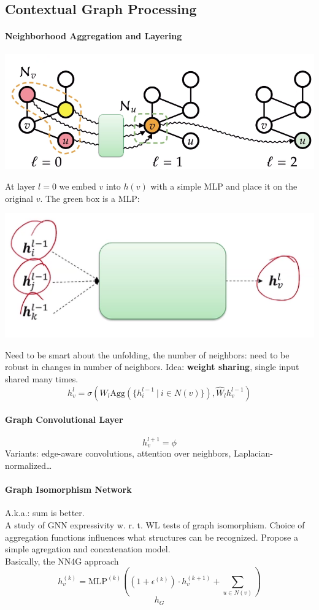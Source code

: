 \documentclass[10pt]{report}
\begin{document}
\subsection{Contextual Graph Processing}
\paragraph{Neighborhood Aggregation and Layering}
\begin{center}
	\includegraphics[scale=0.5]{198.png}
\end{center}
At layer $l=0$ we embed $v$ into $h(v)$ with a simple MLP and place it on the original $v$.
The green box is a MLP:
\begin{center}
	\includegraphics[scale=0.5]{199.png}
\end{center}
Need to be smart about the unfolding, the number of neighbors: need to be robust in changes in number of neighbors. Idea: \textbf{weight sharing}, single input shared many times. %
$$h_v^l = \sigma(W_l\text{Agg}(\{h_i^{l-1}\:|\:i\in N(v)\}), \hat{W}_l h_v^{l-1})$$
\paragraph{Graph Convolutional Layer} %
$$h_v^{l+1} = \phi $$
Variants: edge-aware convolutions, attention over neighbors, Laplacian-normalized\ldots
\paragraph{Graph Isomorphism Network} A.k.a.: sum is better.\\
A study of GNN expressivity w. r. t. WL tests of graph isomorphism. Choice of aggregation functions influences what structures can be recognized. Propose a simple agregation and concatenation model.\\
Basically, the NN4G approach
$$h_v^{(k)} = \text{MLP}^{(k)}\left((1+\epsilon^{(k)})\cdot h_v^{(k+1)} + \sum_{u\in N(v)}\right)$$ %
$$h_G$$ %
\end{document}
